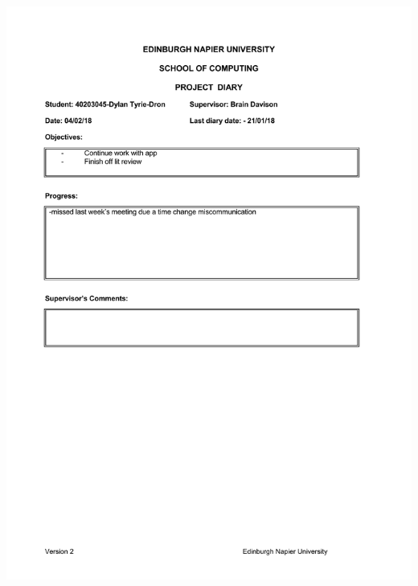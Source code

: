 \documentclass[12pt,a4paper]{article}
\begin{document}
\begin{appendices}
\includegraphics[width=\textwidth,height=\textheight,keepaspectratio]{project_diary_10th_entry.pdf}

\end{appendices}
\end{document}
